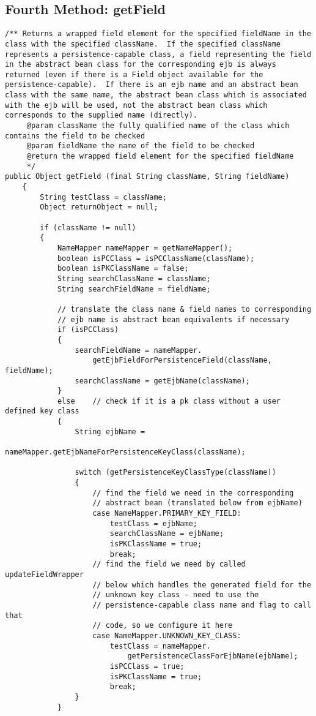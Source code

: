 \newpage
\subsection{Fourth Method: getField} 
	 
\begin{lstlisting}
/** Returns a wrapped field element for the specified fieldName in the class with the specified className.  If the specified className represents a persistence-capable class, a field representing the field in the abstract bean class for the corresponding ejb is always returned (even if there is a Field object available for the persistence-capable).  If there is an ejb name and an abstract bean class with the same name, the abstract bean class which is associated with the ejb will be used, not the abstract bean class which corresponds to the supplied name (directly).
	 @param className the fully qualified name of the class which contains the field to be checked
	 @param fieldName the name of the field to be checked
	 @return the wrapped field element for the specified fieldName
	 */
public Object getField (final String className, String fieldName)
	{
		String testClass = className;
		Object returnObject = null;

		if (className != null)
		{
			NameMapper nameMapper = getNameMapper();
			boolean isPCClass = isPCClassName(className);
			boolean isPKClassName = false;
			String searchClassName = className;
			String searchFieldName = fieldName;

			// translate the class name & field names to corresponding 
			// ejb name is abstract bean equivalents if necessary
			if (isPCClass)
			{
				searchFieldName = nameMapper.
					getEjbFieldForPersistenceField(className, fieldName);
				searchClassName = getEjbName(className);
			}
			else	// check if it is a pk class without a user defined key class
			{
				String ejbName = 
					nameMapper.getEjbNameForPersistenceKeyClass(className);

				switch (getPersistenceKeyClassType(className))
				{
					// find the field we need in the corresponding 
					// abstract bean (translated below from ejbName)
					case NameMapper.PRIMARY_KEY_FIELD:
						testClass = ejbName;
						searchClassName = ejbName;
						isPKClassName = true;
						break;
					// find the field we need by called updateFieldWrapper
					// below which handles the generated field for the 
					// unknown key class - need to use the
					// persistence-capable class name and flag to call that
					// code, so we configure it here
					case NameMapper.UNKNOWN_KEY_CLASS:
						testClass = nameMapper.
							getPersistenceClassForEjbName(ejbName);
						isPCClass = true;
						isPKClassName = true;
						break;
				}
			}


\end{lstlisting}
